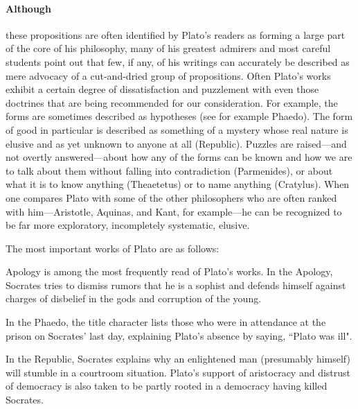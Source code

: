 \documentclass[11pt]{article}
\begin{document}
		\paragraph{Although} these propositions are often identified by Plato's readers as forming a large part of the core of his philosophy, many of his greatest admirers and most careful students point out that few, if any, of his writings can accurately be described as mere advocacy of a cut-and-dried group of propositions. Often Plato's works exhibit a certain degree of dissatisfaction and puzzlement with even those doctrines that are being recommended for our consideration. For example, the forms are sometimes described as hypotheses (see for example Phaedo). The form of good in particular is described as something of a mystery whose real nature is elusive and as yet unknown to anyone at all (Republic). Puzzles are raised---and not overtly answered---about how any of the forms can be known and how we are to talk about them without falling into contradiction (Parmenides), or about what it is to know anything (Theaetetus) or to name anything (Cratylus). When one compares Plato with some of the other philosophers who are often ranked with him---Aristotle, Aquinas, and Kant, for example---he can be recognized to be far more exploratory, incompletely systematic, elusive. 

		\par The most important works of Plato are as follows:
		\begin{description}[align=right]
			\item[Apology] Apology is among the most frequently read of Plato's works. In the Apology, Socrates tries to dismiss rumors that he is a sophist and defends himself against charges of disbelief in the gods and corruption of the young.
			\item[Phaedo] In the Phaedo, the title character lists those who were in attendance at the prison on Socrates' last day, explaining Plato's absence by saying, ``Plato was ill".
			\item[Republic] In the Republic, Socrates explains why an enlightened man (presumably himself) will stumble in a courtroom situation. Plato's support of aristocracy and distrust of democracy is also taken to be partly rooted in a democracy having killed Socrates.
		\end{description}
\end{document}
